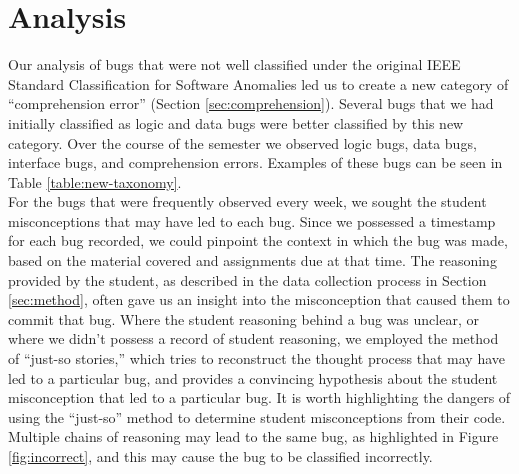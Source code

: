 \documentclass{sig-alternate}
\begin{document}
\section{Analysis}
\label{sec:analysis}

Our analysis of bugs that were not well classified under the original
IEEE Standard Classification for Software Anomalies led us to create a
new category of ``comprehension error'' (Section
\ref{sec:comprehension}). Several bugs that we had initially
classified as logic and data bugs were better classified by this new
category. Over the course of the semester we observed \numlogic logic
bugs, \numdata data bugs, \numinterface interface bugs, and \numcomp
comprehension errors. Examples of these bugs can be seen in Table
\ref{table:new-taxonomy}.\\




For the bugs that were frequently observed every week, we sought the
student misconceptions that may have led to each bug. Since we
possessed a timestamp for each bug recorded, we could pinpoint the
context in which the bug was made, based on the material covered and
assignments due at that time. The reasoning provided by the
student, as described in the data collection process in Section
\ref{sec:method}, often gave us an insight into the misconception that
caused them to commit that bug. Where the student reasoning behind a
bug was unclear, or where we didn't possess a record of student
reasoning, we employed the method of ``just-so stories,''
\cite{JoniSolowayGoldmanEhrlich83} which tries to reconstruct the
thought process that may have led to a particular bug, and provides a
convincing hypothesis about the student misconception that led to a
particular bug. It is worth highlighting the dangers of using the
``just-so'' method to determine student misconceptions from their
code. Multiple chains of reasoning may lead to the same bug, as
highlighted in Figure \ref{fig:incorrect}, and this may cause the bug
to be classified incorrectly.\\
\end{document}
